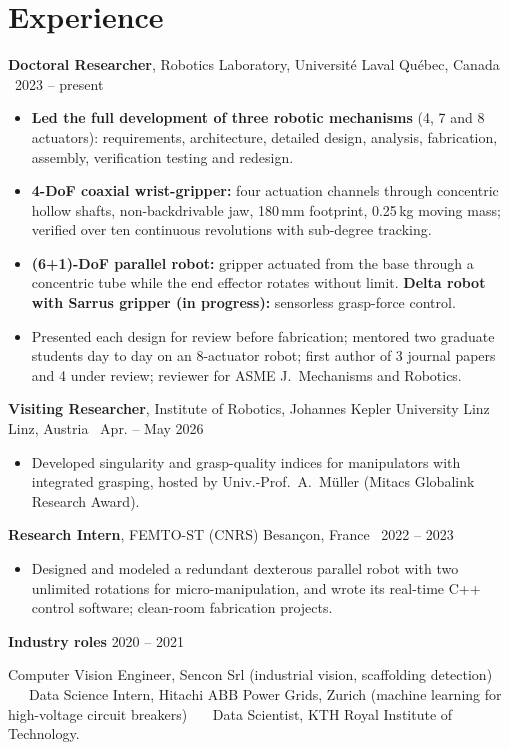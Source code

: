 \documentclass[10pt,letterpaper]{article}
\newcommand{\role}[4]{\textbf{#1}, #2 \hfill {\color{muted}#3 \textbar\ #4}\par}
\begin{document}
\section{Experience}
\role{Doctoral Researcher}{Robotics Laboratory, Universit\'e Laval}{Qu\'ebec, Canada}{2023 -- present}
\begin{itemize}
\item \textbf{Led the full development of three robotic mechanisms} (4, 7 and 8 actuators): requirements, architecture,
detailed design, analysis, fabrication, assembly, verification testing and redesign.
\item \textbf{4-DoF coaxial wrist-gripper:} four actuation channels through concentric hollow shafts, non-backdrivable
jaw, 180\,mm footprint, 0.25\,kg moving mass; verified over ten continuous revolutions with sub-degree tracking.
\item \textbf{(6+1)-DoF parallel robot:} gripper actuated from the base through a concentric tube while the end effector
rotates without limit. \textbf{Delta robot with Sarrus gripper (in progress):} sensorless grasp-force control.
\item Presented each design for review before fabrication; mentored two graduate students day to day on an 8-actuator
robot; first author of 3 journal papers and 4 under review; reviewer for ASME J.\ Mechanisms and Robotics.
\end{itemize}

\vspace{3pt}
\role{Visiting Researcher}{Institute of Robotics, Johannes Kepler University Linz}{Linz, Austria}{Apr. -- May 2026}
\begin{itemize}
\item Developed singularity and grasp-quality indices for manipulators with integrated grasping, hosted by Univ.-Prof.~A.~M\"uller (Mitacs Globalink Research Award).
\end{itemize}

\vspace{3pt}
\role{Research Intern}{FEMTO-ST (CNRS)}{Besan\c{c}on, France}{2022 -- 2023}
\begin{itemize}
\item Designed and modeled a redundant dexterous parallel robot with two unlimited rotations for micro-manipulation, and wrote its real-time C++ control software; clean-room fabrication projects.
\end{itemize}

\vspace{3pt}
\textbf{Industry roles} \hfill {\color{muted}2020 -- 2021}\par
{\small Computer Vision Engineer, Sencon Srl (industrial vision, scaffolding detection) \ \textbullet\ \ Data Science
Intern, Hitachi ABB Power Grids, Zurich (machine learning for high-voltage circuit breakers) \ \textbullet\ \ Data
Scientist, KTH Royal Institute of Technology.}
\end{document}
